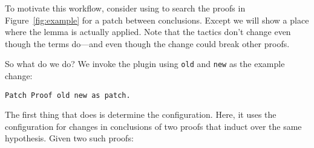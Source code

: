
\begin{figure*}
\begin{minipage}{0.50\textwidth}
\lstset{language=coq, aboveskip=0pt, belowskip=0pt}






\end{minipage}
\hfill
\begin{minipage}{0.48\textwidth}
\lstset{language=coq, aboveskip=0pt, belowskip=0pt}






\end{minipage}
\caption{Two proofs with different conclusions (top) and the
corresponding proof terms (bottom) with relevant type information. We highlight the change in theorem conclusion and
the difference in terms that corresponds to a patch.}
\label{fig:example}
\end{figure*}

To motivate this workflow, consider using \sysname to search the proofs in
Figure~\ref{fig:example} for a patch between conclusions.
Except we will show a place where the lemma is actually applied.
Note that the tactics don't change even though the terms do---and even though the change could break other proofs.

So what do we do?
We invoke the plugin using \lstinline{old} and \lstinline{new} as the example change:

\begin{lstlisting}[language=ml4]
  Patch Proof old new as patch.
\end{lstlisting}

The first thing that \sysname does is determine the configuration.
Here, it uses the configuration for changes in conclusions of two proofs
that induct over the same hypothesis. Given two such
proofs:

